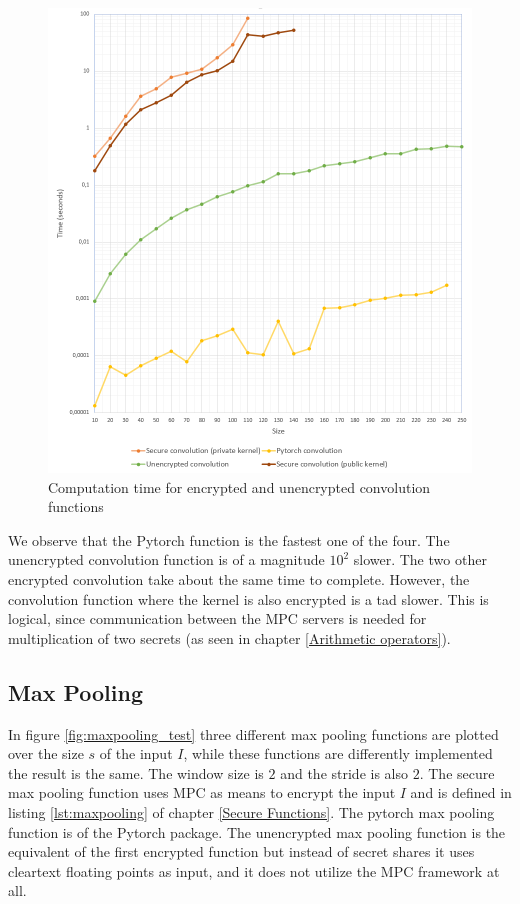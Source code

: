 \begin{figure}[H]
  \includegraphics[scale=0.6]{fig/convolution_test.png}
  \centering
  \caption{Computation time for encrypted and unencrypted convolution functions}
  \label{fig:convolution_test}
\end{figure}

We observe that the Pytorch function is the fastest one of the four. The unencrypted convolution function is of a magnitude $10^2$ slower. The two other encrypted convolution take about the same time to complete. However, the convolution function where the kernel is also encrypted is a tad slower. This is logical, since communication between the MPC servers is needed for multiplication of two secrets (as seen in chapter \ref{Arithmetic operators}).

\subsection{Max Pooling}
In figure \ref{fig:maxpooling_test} three different max pooling functions are plotted over the size $s$ of the input $I$, while these functions are differently implemented the result is the same. The window size is $2$ and the stride is also $2$. The secure max pooling function uses MPC as means to encrypt the input $I$ and is defined in listing \ref{lst:maxpooling} of chapter \ref{Secure Functions}. The pytorch max pooling function is  of the Pytorch package. The unencrypted max pooling function is the equivalent of the first encrypted function but instead of secret shares it uses cleartext floating points as input, and it does not utilize the MPC framework at all.

